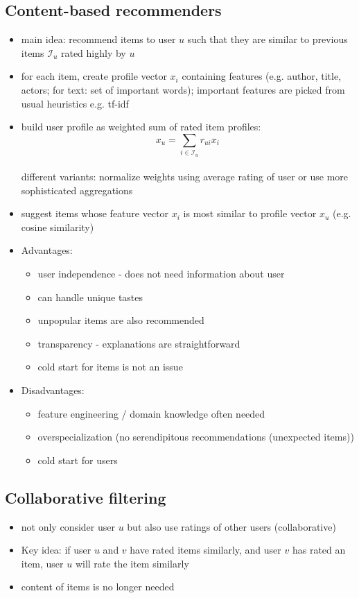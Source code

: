 \subsection{Content-based recommenders}
\begin{itemize}
    \item main idea: recommend items to user $u$ such that they are similar to previous items $\mathcal{I}_u$ rated highly by $u$
    \item for each item, create profile vector $x_i$ containing features (e.g. author, title, actors; for text: set of important words); important features are picked from usual heuristics e.g. tf-idf
    \item build user profile as weighted sum of rated item profiles:
    $$x_u = \sum_{i \in \mathcal{I}_u} r_{ui}x_i$$
    \\ different variants: normalize weights using average rating of user or use more sophisticated aggregations
    \item suggest items whose feature vector $x_i$ is most similar to profile vector $x_u$ (e.g. cosine similarity)
    \item Advantages:
    \begin{itemize}
        \item user independence - does not need information about user
        \item can handle unique tastes
        \item unpopular items are also recommended
        \item transparency - explanations are straightforward
        \item cold start for items is not an issue
    \end{itemize}
    \item Disadvantages:
    \begin{itemize}
        \item feature engineering / domain knowledge often needed
        \item overspecialization (no serendipitous recommendations (unexpected items))
        \item cold start for users
    \end{itemize}
\end{itemize}
\subsection{Collaborative filtering}
\begin{itemize}
    \item not only consider user $u$ but also use ratings of other users (collaborative)
    \item Key idea: if user $u$ and $v$ have rated items similarly, and user $v$ has rated an item, user $u$ will rate the item similarly
    \item content of items is no longer needed
\end{itemize}
